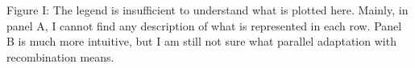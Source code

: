\documentclass[onecolumn,oneside,letterpaper]{article}
\begin{document}
Figure I: The legend is insufficient to understand what is plotted here. Mainly, in panel A, I cannot find any description of what is represented in each row. Panel B is much more intuitive, but I am still not sure what parallel adaptation with recombination means.  




\end{document}
